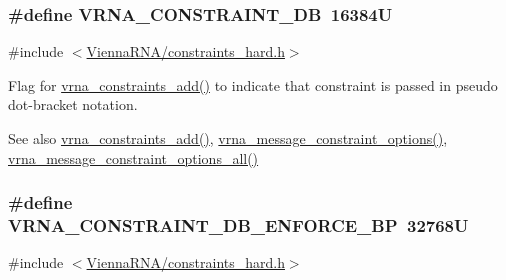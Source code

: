 \subsubsection[{\texorpdfstring{V\+R\+N\+A\+\_\+\+C\+O\+N\+S\+T\+R\+A\+I\+N\+T\+\_\+\+DB}{VRNA_CONSTRAINT_DB}}]{\setlength{\rightskip}{0pt plus 5cm}\#define V\+R\+N\+A\+\_\+\+C\+O\+N\+S\+T\+R\+A\+I\+N\+T\+\_\+\+DB~16384U}\hypertarget{group__hard__constraints_ga4bfc2f15c4f261c62a11af9d2aa80c90}{}\label{group__hard__constraints_ga4bfc2f15c4f261c62a11af9d2aa80c90}


{\ttfamily \#include $<$\hyperlink{constraints__hard_8h}{Vienna\+R\+N\+A/constraints\+\_\+hard.\+h}$>$}



Flag for \hyperlink{group__constraints_ga35a401f680969a556858a8dd5f1d07cc}{vrna\+\_\+constraints\+\_\+add()} to indicate that constraint is passed in pseudo dot-\/bracket notation. 

\begin{DoxySeeAlso}{See also}
\hyperlink{group__constraints_ga35a401f680969a556858a8dd5f1d07cc}{vrna\+\_\+constraints\+\_\+add()}, \hyperlink{group__constraints_gaa1f20b53bf09ac2e6b0dbb13f7d89670}{vrna\+\_\+message\+\_\+constraint\+\_\+options()}, \hyperlink{group__constraints_gaec7e13fa0465c2acc7a621d1aecb709f}{vrna\+\_\+message\+\_\+constraint\+\_\+options\+\_\+all()} 
\end{DoxySeeAlso}
\subsubsection[{\texorpdfstring{V\+R\+N\+A\+\_\+\+C\+O\+N\+S\+T\+R\+A\+I\+N\+T\+\_\+\+D\+B\+\_\+\+E\+N\+F\+O\+R\+C\+E\+\_\+\+BP}{VRNA_CONSTRAINT_DB_ENFORCE_BP}}]{\setlength{\rightskip}{0pt plus 5cm}\#define V\+R\+N\+A\+\_\+\+C\+O\+N\+S\+T\+R\+A\+I\+N\+T\+\_\+\+D\+B\+\_\+\+E\+N\+F\+O\+R\+C\+E\+\_\+\+BP~32768U}\hypertarget{group__hard__constraints_ga29ebe940110d60ab798fdacbcdbbfb7d}{}\label{group__hard__constraints_ga29ebe940110d60ab798fdacbcdbbfb7d}


{\ttfamily \#include $<$\hyperlink{constraints__hard_8h}{Vienna\+R\+N\+A/constraints\+\_\+hard.\+h}$>$}



